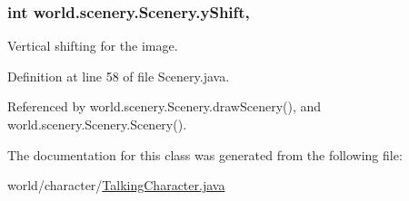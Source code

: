 \hypertarget{a00024_ac9ca2c17cf6920deffe490c013b0e638}{
\subsubsection[{y\-Shift}]{\setlength{\rightskip}{0pt plus 5cm}int world.\-scenery.\-Scenery.\-y\-Shift\hspace{0.3cm}{\ttfamily [protected]}, {\ttfamily [inherited]}}}\label{a00024_ac9ca2c17cf6920deffe490c013b0e638}


Vertical shifting for the image. 



Definition at line 58 of file Scenery.\-java.



Referenced by world.\-scenery.\-Scenery.\-draw\-Scenery(), and world.\-scenery.\-Scenery.\-Scenery().



The documentation for this class was generated from the following file\-:\begin{DoxyCompactItemize}
\item 
world/character/\hyperlink{a00060}{Talking\-Character.\-java}\end{DoxyCompactItemize}
